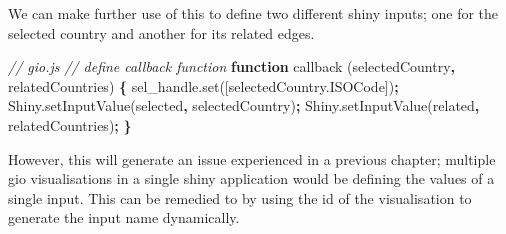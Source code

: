 \documentclass[
  10pt,
]{krantz}
\makeatletter
\newenvironment{Shaded}{\begin{snugshade}}{\end{snugshade}}
\newcommand{\AttributeTok}[1]{\textcolor[rgb]{0.61,0.61,0.61}{#1}}
\newcommand{\CommentTok}[1]{\textcolor[rgb]{0.37,0.37,0.37}{\textit{#1}}}
\newcommand{\KeywordTok}[1]{\textcolor[rgb]{0.27,0.27,0.27}{\textbf{#1}}}
\newcommand{\NormalTok}[1]{#1}
\newcommand{\OperatorTok}[1]{\textcolor[rgb]{0.43,0.43,0.43}{\textbf{#1}}}
\newcommand{\StringTok}[1]{\textcolor[rgb]{0.5,0.5,0.5}{#1}}
\newcommand{\VariableTok}[1]{\textcolor[rgb]{0,0,0}{#1}}
\newenvironment{kframe}{%
\medskip{}
\setlength{\fboxsep}{.8em}
 \def\at@end@of@kframe{}%
 \ifinner\ifhmode%
  \def\at@end@of@kframe{\end{minipage}}%
  \begin{minipage}{\columnwidth}%
 \fi\fi%
 \def\FrameCommand##1{\hskip\@totalleftmargin \hskip-\fboxsep
 \colorbox{shadecolor}{##1}\hskip-\fboxsep
     \hskip-\linewidth \hskip-\@totalleftmargin \hskip\columnwidth}%
 \MakeFramed {\advance\hsize-\width
   \@totalleftmargin\z@ \linewidth\hsize
   \@setminipage}}%
 {\par\unskip\endMakeFramed%
 \at@end@of@kframe}
\renewenvironment{Shaded}{\begin{kframe}}{\end{kframe}}
\makeatother
\begin{document}
We can make further use of this to define two different shiny inputs; one for the selected country and another for its related edges.

\begin{Shaded}
\begin{Highlighting}[]
\CommentTok{// gio.js}
\CommentTok{// define callback function}
\KeywordTok{function} \AttributeTok{callback}\NormalTok{ (selectedCountry}\OperatorTok{,}\NormalTok{ relatedCountries) }\OperatorTok{\{}
  \VariableTok{sel\_handle}\NormalTok{.}\AttributeTok{set}\NormalTok{([}\VariableTok{selectedCountry}\NormalTok{.}\AttributeTok{ISOCode}\NormalTok{])}\OperatorTok{;}
  \VariableTok{Shiny}\NormalTok{.}\AttributeTok{setInputValue}\NormalTok{(}\StringTok{\textquotesingle{}selected\textquotesingle{}}\OperatorTok{,}\NormalTok{ selectedCountry)}\OperatorTok{;}
  \VariableTok{Shiny}\NormalTok{.}\AttributeTok{setInputValue}\NormalTok{(}\StringTok{\textquotesingle{}related\textquotesingle{}}\OperatorTok{,}\NormalTok{ relatedCountries)}\OperatorTok{;}
\OperatorTok{\}}
\end{Highlighting}
\end{Shaded}

However, this will generate an issue experienced in a previous chapter; multiple gio visualisations in a single shiny application would be defining the values of a single input. This can be remedied to by using the id of the visualisation to generate the input name dynamically.
\end{document}
